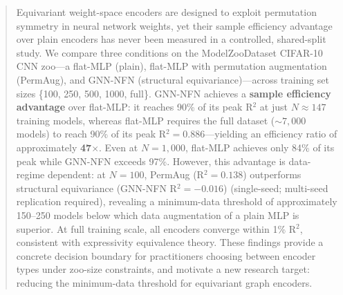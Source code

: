 \begin{abstract}
Equivariant weight-space encoders are designed to exploit permutation symmetry in neural network weights, yet their sample efficiency advantage over plain encoders has never been measured in a controlled, shared-split study. We compare three conditions on the ModelZooDataset CIFAR-10 CNN zoo---a flat-MLP (plain), flat-MLP with permutation augmentation (PermAug), and GNN-NFN (structural equivariance)---across training set sizes \{100, 250, 500, 1000, full\}. GNN-NFN achieves a \textbf{sample efficiency advantage} over flat-MLP: it reaches 90\% of its peak R$^2$ at just $N{\approx}147$ training models, whereas flat-MLP requires the full dataset (${\sim}7{,}000$ models) to reach 90\% of its peak R$^2{=}0.886$---yielding an efficiency ratio of approximately \textbf{47$\times$}. Even at $N{=}1{,}000$, flat-MLP achieves only 84\% of its peak while GNN-NFN exceeds 97\%. However, this advantage is data-regime dependent: at $N{=}100$, PermAug (R$^2{=}0.138$) outperforms structural equivariance (GNN-NFN R$^2{=}{-}0.016$) (single-seed; multi-seed replication required), revealing a minimum-data threshold of approximately 150--250 models below which data augmentation of a plain MLP is superior. At full training scale, all encoders converge within 1\% R$^2$, consistent with expressivity equivalence theory. These findings provide a concrete decision boundary for practitioners choosing between encoder types under zoo-size constraints, and motivate a new research target: reducing the minimum-data threshold for equivariant graph encoders.
\end{abstract}
